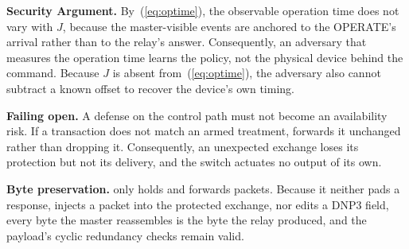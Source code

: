 \textbf{Security Argument.} By~(\ref{eq:optime}), the observable operation time does not vary with $J$,
because the master-visible events are anchored to the OPERATE's arrival rather than to the relay's
answer. Consequently, an adversary that measures the operation time learns the policy, not the physical
device behind the command. Because $J$ is absent from~(\ref{eq:optime}), the adversary also cannot
subtract a known offset to recover the device's own timing.

\textbf{Failing open.} A defense on the control path must not become an availability risk. If a
transaction does not match an armed treatment, \sysname forwards it unchanged rather than dropping it.
Consequently, an unexpected exchange loses its protection but not its delivery, and the switch
actuates no output of its own.

\textbf{Byte preservation.} \sysname only holds and forwards packets. Because it neither pads a
response, injects a packet into the protected exchange, nor edits a DNP3 field, every byte the master
reassembles is the byte the relay produced, and the payload's cyclic redundancy checks remain valid.
